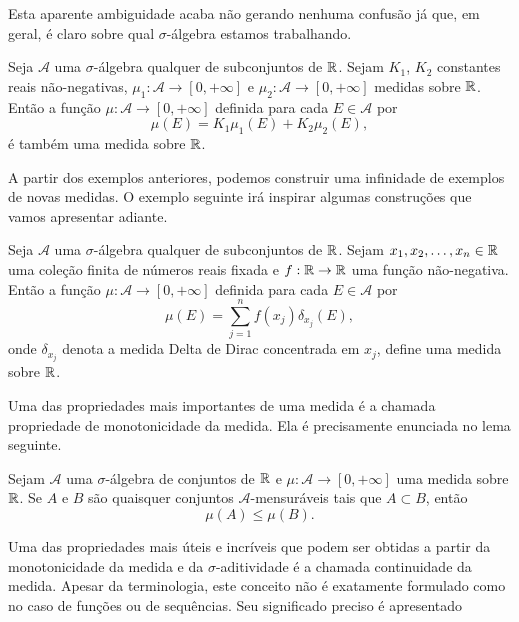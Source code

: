         Esta aparente ambiguidade acaba não gerando nenhuma 
        confusão já que, em geral, é claro sobre qual $\sigma$-álgebra estamos trabalhando. 
        \begin{exemplo}
        	Seja $\mathcal{A}$ uma $\sigma$-álgebra qualquer de subconjuntos de $\mathbb{R}$. Sejam
        	$K_1$, $K_2$ constantes reais não-negativas, 
        	$\mu_1:\mathcal{A} \to [0,+\infty]$ e $\mu_2:\mathcal{A} \to [0,+\infty]$ medidas sobre $\mathbb{R}$. 
        	Então a função $\mu:\mathcal{A}\to [0,+\infty]$ definida para cada $E\in \mathcal{A}$ por
        	\[
        	    \mu(E) = K_1\mu_1(E)+K_2\mu_2(E),
        	\]
        	é também uma medida sobre $\mathbb{R}$. 
        \end{exemplo}
        A partir dos exemplos anteriores, podemos construir uma infinidade de exemplos
        de novas medidas. O exemplo seguinte irá inspirar algumas construções que vamos
        apresentar adiante.
        \begin{exemplo}
        	Seja $\mathcal{A}$ uma $\sigma$-álgebra qualquer de subconjuntos de $\mathbb{R}$. 
        	Sejam $x_1,x_2,\ldots,x_n\in\mathbb{R}$ uma coleção 
        	finita de números reais fixada e $f:\mathbb{R}\to\mathbb{R}$ 
        	uma função não-negativa. Então a função 
        	$\mu:\mathcal{A}\to [0,+\infty]$ definida para cada $E\in \mathcal{A}$ por
        	\[
        	\mu(E) = \sum_{j=1}^n f(x_j)\delta_{x_j}(E),
        	\]
        	onde $\delta_{x_j}$ denota a medida Delta de 
        	Dirac concentrada em $x_j$, define uma medida sobre $\mathbb{R}$. 
        \end{exemplo}
        Uma das propriedades mais importantes de uma medida é a chamada propriedade
        de monotonicidade da medida. Ela é precisamente enunciada no lema seguinte.
        \begin{lema}
        \label{exercicio-monotonicidade-medida}
        	Sejam $\mathcal{A}$ uma $\sigma$-álgebra de conjuntos de $\mathbb{R}$ 
        	e $\mu:\mathcal{A}\to [0,+\infty]$ uma medida sobre $\mathbb{R}$.
        	Se $A$ e $B$ são quaisquer conjuntos $\mathcal{A}$-mensuráveis 
        	tais que $A\subset B$, então
        	\[\mu(A)\leq \mu(B).\] 
        \end{lema}
        Uma das propriedades mais úteis e incríveis que podem ser obtidas a partir da
        monotonicidade da medida e da $\sigma$-aditividade é a chamada continuidade da
        medida. Apesar da terminologia, este conceito não é exatamente formulado como
        no caso de funções ou de sequências. Seu significado preciso é apresentado 

